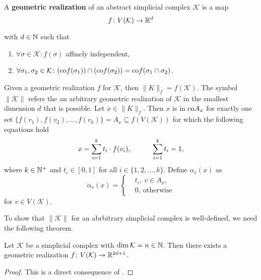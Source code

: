 \begin{defin}
  A \textbf{geometric realization} of an abstract simplicial complex $\mathcal{K}$ is a map
  \begin{equation*}
    f\colon V(\mathcal{K}) \to \mathbb{R}^d
  \end{equation*}

  with $d \in \mathbb{N}$ such that
  \begin{enumerate}
    \item $\forall \sigma \in \mathcal{K}\colon f(\sigma)$ affinely independent,
    \item $\forall \sigma_1, \sigma_2\in \mathcal{K}\colon ({\rm co}f(\sigma_1)) \cap ({\rm co} f(\sigma_2)) = {\rm co}f(\sigma_1 \cap \sigma_2)$.
  \end{enumerate}
    Given a geometric realization $f$ for $\mathcal{K}$, then $\lVert K \rVert_f = f(\mathcal{K})$. The symbol $\lVert \mathcal{K} \rVert$ refers the an arbitrary geometric realization of $\mathcal{K}$ in the smallest dimension $d$ that is possible.
    Let $x \in \lVert K \rVert_f$. Then $x$ is in ${\rm co}A_x$ for exactly one set $\{f(v_1), f(v_2), \ldots, f(v_k)\} = A_x \subseteq f(V(\mathcal{K}))$ for which the following equations hold 
    \begin{equation*}
      x = \sum\limits_{i=1}^k t_i \cdot f(v_i), \hspace*{30px} \sum\limits_{i=1}^k t_i = 1, 
    \end{equation*}
    where $k\in \mathbb{N}^+$ and $t_i \in [0, 1]$ for all $i \in \{1, 2, \ldots, k\}$. Define $\alpha_v(x)$ as
    \begin{equation*}
      \alpha_v(x) = \begin{cases}
        &t_i, \: v \in A_x, \\
        &0, \: \text{otherwise}
      \end{cases}
    \end{equation*}
    for $v \in V(\mathcal{K})$.
\end{defin} 

To show that $\lVert \mathcal{K} \rVert$ for an abrbitrary simplicial complex is well-defined, we need the following theorem.

\begin{thm}
  Let $\mathcal{K}$ be a simplicial complex with $\dim \mathcal{K} = n \in \mathbb{N}$. Then there exists a geometric realization $f\colon V(\mathcal{K}) \to \mathbb{R}^{2d+1}$.
\end{thm}

\begin{proof}
  This is a direct consequence of \cite[Lemma 5.1.1]{using2003}.
\end{proof}

